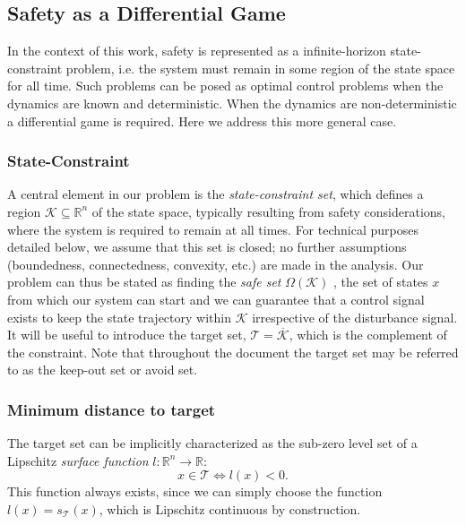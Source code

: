 \documentclass{journal}
\newcommand{\K}{\mathcal{K}}
\newcommand{\T}{\mathcal{T}}
\newcommand{\RR}{\mathbb{R}}
\begin{document}
\subsection{Safety as a Differential Game}\label{subsec:formulation_constraints}
In the context of this work, safety is represented as a infinite-horizon state-constraint problem, i.e. the system must remain in some region of the state space for all time. Such problems can be posed as optimal control problems when the dynamics are known and deterministic. When the dynamics are non-deterministic a differential game is required. Here we address this more general case. 

\subsubsection{State-Constraint}
A central element in our problem is the \emph{state-constraint set}, which defines a region $\K\subseteq \RR^n$ of the state space, typically resulting from safety considerations, where the system is required to remain at all times. For technical purposes detailed below, we assume that this set is closed; no further assumptions (boundedness, connectedness, convexity, etc.) are made in the analysis. Our problem can thus be stated as finding the \emph{safe set} $\Omega(\K)$ , the set of states $x$ from which our system can start and we can guarantee that a control signal exists to keep the state trajectory within $\K$ irrespective of the disturbance signal. It will be useful to introduce the target set, $\T=\overline{\K}$, which is the complement of the constraint. Note that throughout the document the target set may be referred to as the keep-out set or avoid set. 

\subsubsection{Minimum distance to target}
The target set can be implicitly characterized as the sub-zero level set of a Lipschitz \emph{surface function} $l:\RR^n\rightarrow\RR$: 
\begin{equation}\label{eq:l}
x\in\T\iff l(x)<0.
\end{equation}
This function always exists, since we can simply choose the function $l(x) = s_{\T}(x)$, 
which is Lipschitz continuous by construction. 
\end{document}
